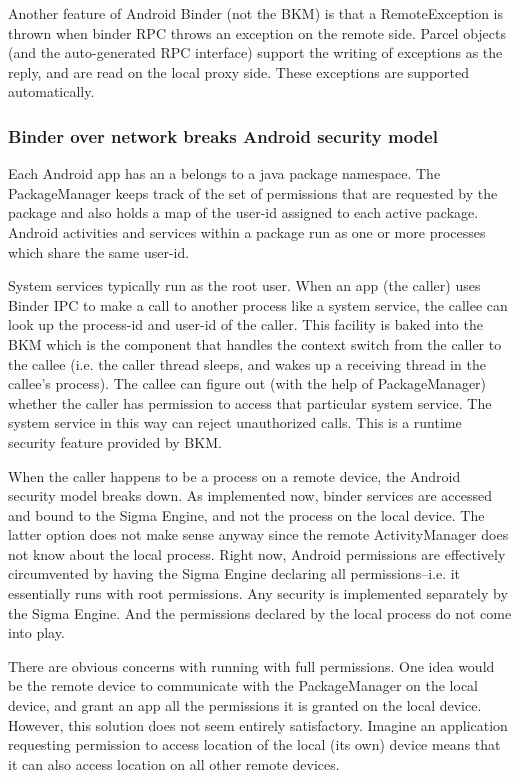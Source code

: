 \documentclass[prodmode]{acmlarge}
\begin{document}
Another feature of Android Binder (not the BKM) is that a RemoteException is thrown when binder RPC throws an exception on the remote side. Parcel objects (and the auto-generated RPC interface) support the writing of exceptions as the reply, and are read on the local proxy side. These exceptions are supported automatically. 

\subsubsection{Binder over network breaks Android security model}
Each Android app has an a belongs to a java package namespace. The PackageManager keeps track of the set of permissions that are requested by the package and also holds a map of the user-id assigned to each active package. Android activities and services within a package run as one or more processes which share the same user-id.

System services typically run as the root user. When an app (the caller) uses Binder IPC to make a call to another process like a system service, the callee can look up the process-id and user-id of the caller. This facility is baked into the BKM which is the component that handles the context switch from the caller to the callee (i.e. the caller thread sleeps, and wakes up a receiving thread in the callee's process). The callee can figure out (with the help of PackageManager) whether the caller has permission to access that particular system service. The system service in this way can reject unauthorized calls. This is a runtime security feature provided by BKM.

When the caller happens to be a process on a remote device, the Android security model breaks down. As implemented now, binder services are accessed and bound to the Sigma Engine, and not the process on the local device. The latter option does not make sense anyway since the remote ActivityManager does not know about the local process. Right now, Android permissions are effectively circumvented by having the Sigma Engine declaring all permissions--i.e. it essentially runs with root permissions. Any security is implemented separately by the Sigma Engine. And the permissions declared by the local process do not come into play.

There are obvious concerns with running with full permissions. One idea would be the remote device to communicate with the PackageManager on the local device, and grant an app all the permissions it is granted on the local device. However, this solution does not seem entirely satisfactory. Imagine an application requesting permission to access location of the local (its own) device means that it can also access location on all other remote devices.
\end{document}
